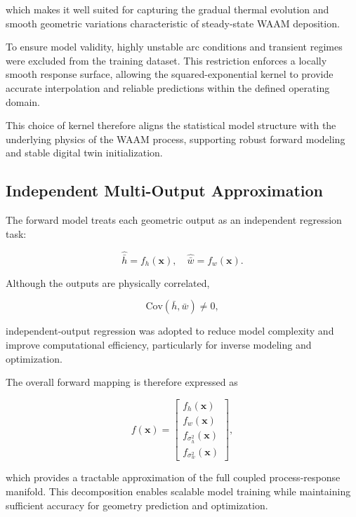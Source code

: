 \documentclass[11pt]{article}
\begin{document}
which makes it well suited for capturing the gradual thermal evolution and smooth geometric variations characteristic of steady-state WAAM deposition.

To ensure model validity, highly unstable arc conditions and transient regimes were excluded from the training dataset. This restriction enforces a locally smooth response surface, allowing the squared-exponential kernel to provide accurate interpolation and reliable predictions within the defined operating domain.

This choice of kernel therefore aligns the statistical model structure with the underlying physics of the WAAM process, supporting robust forward modeling and stable digital twin initialization.

\subsection{Independent Multi-Output Approximation}

The forward model treats each geometric output as an independent regression task:

\begin{equation}
\hat{\bar{h}} = f_h(\mathbf{x}), \quad
\hat{\bar{w}} = f_w(\mathbf{x}).
\end{equation}

Although the outputs are physically correlated,

\begin{equation}
\mathrm{Cov}(\bar{h}, \bar{w}) \neq 0,
\end{equation}

independent-output regression was adopted to reduce model complexity and improve computational efficiency, particularly for inverse modeling and optimization.

The overall forward mapping is therefore expressed as

\begin{equation}
f(\mathbf{x}) =
\begin{bmatrix}
f_h(\mathbf{x}) \\
f_w(\mathbf{x}) \\
f_{\sigma_h^2}(\mathbf{x}) \\
f_{\sigma_w^2}(\mathbf{x})
\end{bmatrix},
\end{equation}

which provides a tractable approximation of the full coupled process-response manifold. This decomposition enables scalable model training while maintaining sufficient accuracy for geometry prediction and optimization.
\end{document}
